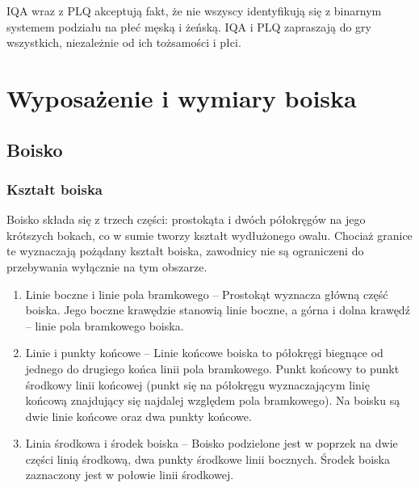 \documentclass[12pt]{article}
\begin{document}
IQA wraz z PLQ akceptują fakt, że nie wszyscy identyfikują się z
binarnym systemem podziału na płeć męską i żeńską. IQA i PLQ zapraszają
do gry wszystkich, niezależnie od ich tożsamości i płci.

\pagebreak
\section{Wyposażenie i wymiary boiska}

\subsection{Boisko}

\subsubsection{Kształt boiska}
Boisko składa się z trzech części: prostokąta i dwóch półokręgów na jego
krótszych bokach, co w sumie tworzy kształt wydłużonego owalu. Chociaż
granice te wyznaczają pożądany kształt boiska, zawodnicy nie są
ograniczeni do przebywania wyłącznie na tym obszarze.
\begin{enumerate}
	\item{Linie boczne i linie pola bramkowego} -- Prostokąt wyznacza
	      główną część boiska. Jego boczne krawędzie stanowią linie boczne, a
	      górna i dolna krawędź -- linie pola bramkowego boiska.

	\item{Linie i punkty końcowe} -- Linie końcowe boiska to
	      półokręgi biegnące od jednego do drugiego końca linii pola bramkowego.
	      Punkt końcowy to punkt środkowy linii końcowej (punkt się na półokręgu
	      wyznaczającym linię końcową znajdujący się najdalej względem pola
	      bramkowego). Na boisku są dwie linie końcowe oraz dwa punkty końcowe.

	\item{Linia środkowa i środek boiska} -- Boisko podzielone
	      jest w poprzek na dwie części linią środkową, dwa punkty środkowe linii
	      bocznych. Środek boiska zaznaczony jest w połowie linii środkowej.
\end{enumerate}
\end{document}
